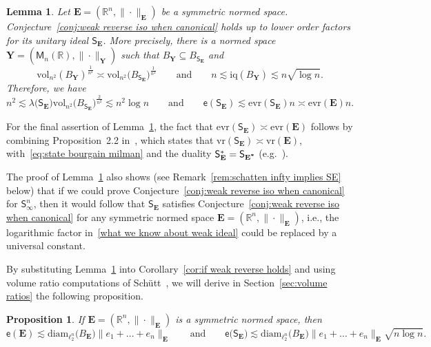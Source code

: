 \documentclass[11pt,reqno]{amsart}
\newcommand{\diam}{\mathrm{diam}}
\newcommand{\vr}{\mathrm{vr}}
\newcommand{\evr}{\mathrm{evr}}
\newcommand{\Y}{\mathbf Y}
\newcommand{\R}{\mathbb R}
\newtheorem{lemma}[theorem]{Lemma}
\newtheorem{proposition}[theorem]{Proposition}
\theoremstyle{remark}
\newcommand{\iq}{\mathrm{iq}}
\newcommand{\M}{\mathsf{M}}
\newcommand{\sfS}{\mathsf{S}}
\renewcommand{\subset}{\subseteq}
\newcommand{\ee}{\mathsf{e}}
\newcommand{\vol}{\mathrm{vol}}
\renewcommand{\1}{\mathbf 1}
\newcommand{\bfE}{\mathbf{E}}
\begin{document}
\begin{lemma}\label{lem:reverse iso for sym} Let $\bfE=(\R^n,\|\cdot\|_{\bfE})$ be a symmetric normed space. Conjecture~\ref{conj:weak reverse iso when canonical} holds up to lower order factors for its unitary ideal $\sfS_{\bfE}$. More precisely, there is a normed space $\Y=(\M_n(\R),\|\cdot\|_\Y)$ such that $B_\Y\subset B_{\sfS_\bfE}$ and
\begin{equation}\label{what we know about weak ideal}
\vol_{n^2}(B_\Y)^{\frac{1}{n^2}}\asymp \vol_{n^2}\big(B_{\sfS_\bfE}\big)^{\frac{1}{n^2}}\qquad \mathrm{and}\qquad n\lesssim \iq(B_\Y)\lesssim n\sqrt{\log n}.
\end{equation}
Therefore, we have
$$
n^2\lesssim \lambda\big(\sfS_\bfE\big)\vol_{n^2}\big(B_{\sfS_\bfE}\big)^{\frac{2}{n^2}}\lesssim n^2\log n
\qquad\mathrm{and}\qquad  \ee(\sfS_\bfE)\lesssim \evr(\sfS_\bfE)n\asymp \evr(\bfE)n.
$$
\end{lemma}
For the final assertion of Lemma~\ref{lem:reverse iso for sym}, the fact that $\evr(\sfS_\bfE)\asymp \evr(\bfE)$ follows by combining Proposition~2.2 in~\cite{Sch82}, which states that $\vr(\sfS_\bfE)\asymp \vr(\bfE)$, with~\eqref{eq:state bourgain milman} and the  duality $\sfS_\bfE^*=\sfS_{\bfE^{\textbf *}}$ (e.g.~\cite[Theorem~1.17]{Sim79}).

The proof of Lemma~\ref{lem:reverse iso for sym} also shows (see Remark~\ref{rem:schatten infty implies SE} below) that if we could prove Conjecture~\ref{conj:weak reverse iso when canonical} for $\sfS_\infty^n$, then it would follow that $\sfS_\bfE$ satisfies Conjecture~\ref{conj:weak reverse iso when canonical} for any symmetric normed space $\bfE=(\R^n,\|\cdot\|_\bfE)$, i.e.,  the logarithmic factor in~\eqref{what we know about weak ideal} could be replaced by a universal constant.




By substituting Lemma~\ref{lem:reverse iso for sym} into Corollary~\ref{cor:if weak reverse holds} and using volume ratio computations of Sch\"utt~\cite{Sch82}, we will derive in Section~\ref{sec:volume ratios} the following proposition.


\begin{proposition}\label{prop:weak rev iso sym}  If $\bfE=(\R^n,\|\cdot\|_{\bfE})$ is a symmetric normed space, then
$$
\ee(\bfE)\lesssim \diam_{\ell_2^n}\big(B_\bfE\big)\|e_1+\ldots+e_n\|_{\bfE}\qquad\mathrm{and}\qquad \ee\big(\sfS_\bfE\big)\lesssim \diam_{\ell_2^n}\big(B_\bfE\big)\|e_1+\ldots+e_n\|_{\bfE}\sqrt{n\log n}.
$$
\end{proposition}
\end{document}
